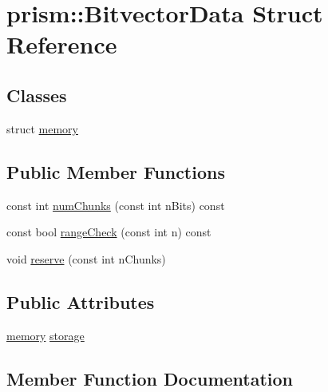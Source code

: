 \hypertarget{structprism_1_1_bitvector_data}{}\section{prism\+:\+:Bitvector\+Data Struct Reference}
\label{structprism_1_1_bitvector_data}
\subsection*{Classes}
\begin{DoxyCompactItemize}
\item 
struct \hyperlink{structprism_1_1_bitvector_data_1_1memory}{memory}
\end{DoxyCompactItemize}
\subsection*{Public Member Functions}
\begin{DoxyCompactItemize}
\item 
const int \hyperlink{structprism_1_1_bitvector_data_a64584940a3ca3556048e95b22ac4d5dd}{num\+Chunks} (const int n\+Bits) const 
\item 
const bool \hyperlink{structprism_1_1_bitvector_data_a0d6a154da2f0734439a21694119834fa}{range\+Check} (const int n) const 
\item 
void \hyperlink{structprism_1_1_bitvector_data_ae40f25a068b90247edcbd4f34fa2a18f}{reserve} (const int n\+Chunks)
\end{DoxyCompactItemize}
\subsection*{Public Attributes}
\begin{DoxyCompactItemize}
\item 
\hyperlink{structprism_1_1_bitvector_data_1_1memory}{memory} \hyperlink{structprism_1_1_bitvector_data_abcf70b2679d4c52bf398a1a308aca5c2}{storage}
\end{DoxyCompactItemize}


\subsection{Member Function Documentation}
